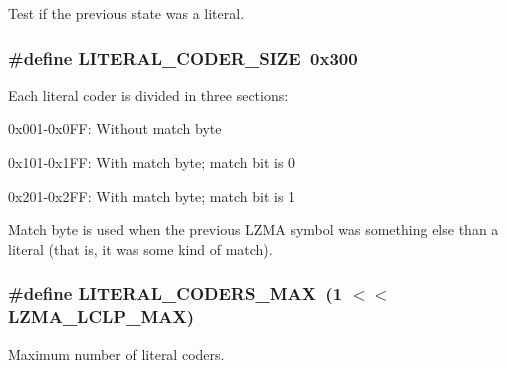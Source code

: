 Test if the previous state was a literal. 

\subsubsection[{L\-I\-T\-E\-R\-A\-L\-\_\-\-C\-O\-D\-E\-R\-\_\-\-S\-I\-Z\-E}]{\setlength{\rightskip}{0pt plus 5cm}\#define L\-I\-T\-E\-R\-A\-L\-\_\-\-C\-O\-D\-E\-R\-\_\-\-S\-I\-Z\-E~0x300}\label{lzma__common_8h_a10b5f469b05969cb31c55a66e0de8803}
Each literal coder is divided in three sections\-:
\begin{DoxyItemize}
\item 0x001-\/0x0\-F\-F\-: Without match byte
\item 0x101-\/0x1\-F\-F\-: With match byte; match bit is 0
\item 0x201-\/0x2\-F\-F\-: With match byte; match bit is 1
\end{DoxyItemize}

Match byte is used when the previous L\-Z\-M\-A symbol was something else than a literal (that is, it was some kind of match). 
\subsubsection[{L\-I\-T\-E\-R\-A\-L\-\_\-\-C\-O\-D\-E\-R\-S\-\_\-\-M\-A\-X}]{\setlength{\rightskip}{0pt plus 5cm}\#define L\-I\-T\-E\-R\-A\-L\-\_\-\-C\-O\-D\-E\-R\-S\-\_\-\-M\-A\-X~(1 $<$$<$ L\-Z\-M\-A\-\_\-\-L\-C\-L\-P\-\_\-\-M\-A\-X)}\label{lzma__common_8h_aec4bc6b32a64f98d6ff9c04034a42cb9}


Maximum number of literal coders. 

